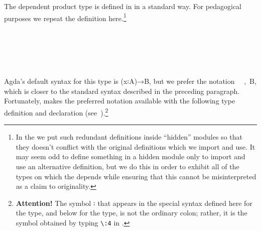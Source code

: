 The dependent product type is defined in \typtop in a standard way. For pedagogical purposes we repeat the definition here.\footnote{In the \ualib we put such redundant definitions inside ``hidden'' modules so that they doesn't conflict with the original definitions which we import and use. It may seem odd to define something in a hidden module only to import and use an alternative definition, but we do this in order to exhibit all of the types on which the \ualib depends while ensuring that this cannot be misinterpreted as a claim to originality.}
\ccpad
\begin{code}%
\>[1]\AgdaSpace{}%
\AgdaSpace{}%
\AgdaSymbol{\{}\AgdaSpace{}%
\AgdaSymbol{\}}\AgdaSpace{}%
\AgdaSymbol{\{}\AgdaSpace{}%
\AgdaSymbol{:}\AgdaSpace{}%
\AgdaSpace{}%
\AgdaSpace{}%
\AgdaSymbol{\}}\AgdaSpace{}%
\AgdaSymbol{(}\AgdaSpace{}%
\AgdaSymbol{:}\AgdaSpace{}%
\AgdaSpace{}%
\AgdaSpace{}%
\AgdaSpace{}%
\AgdaSpace{}%
\AgdaSymbol{)}\AgdaSpace{}%
\AgdaSymbol{:}\AgdaSpace{}%
\AgdaSpace{}%
\AgdaSpace{}%
\AgdaSpace{}%
%
\>[53]\<%
\\
\>[1][@{}l@{\AgdaIndent{0}}]%
\>[2]\AgdaSpace{}%
\AgdaOperator{\AgdaInductiveConstructor{\AgdaUnderscore{},\AgdaUnderscore{}}}\<%
\\
%
\>[2]\<%
\\
\>[2][@{}l@{\AgdaIndent{0}}]%
\>[3]\AgdaSpace{}%
\AgdaSymbol{:}\AgdaSpace{}%
\<%
\\
%
\>[3]\AgdaSpace{}%
\AgdaSymbol{:}\AgdaSpace{}%
\AgdaSpace{}%
\<%
\end{code}
\ccpad
Agda's default syntax for this type is (\ab x꞉\ab A)\as →\ab B, but we prefer the notation ~~,~\ab B, which is closer to the standard syntax described in the preceding paragraph. Fortunately, \typtop makes the preferred notation available with the following type definition and  declaration (see~\cite[Σ types]{MHE}).\footnote{\label{fncolon}\textbf{Attention!} The symbol \af ꞉ that appears in the special syntax defined here for the  type, and below for the  type, is not the ordinary colon; rather, it is the symbol obtained by typing \texttt{\textbackslash{}:4} in \agdatwomode.} 
